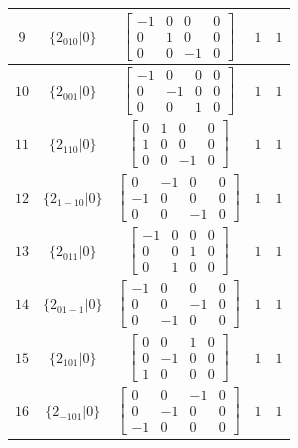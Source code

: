 \documentclass[fleqn,8pt]{jsarticle}
\begin{document}
\begin{longtable}{ccccc}
$ 9 $ & $ \{2{}_{010}|0\} $ & $ \begin{bmatrix} -1 & 0 & 0 & 0 \\ 0 & 1 & 0 & 0 \\ 0 & 0 & -1 & 0 \end{bmatrix} $ & $ 1 $ & $ 1 $ \\ \hline
$ 10 $ & $ \{2{}_{001}|0\} $ & $ \begin{bmatrix} -1 & 0 & 0 & 0 \\ 0 & -1 & 0 & 0 \\ 0 & 0 & 1 & 0 \end{bmatrix} $ & $ 1 $ & $ 1 $ \\ \hline
$ 11 $ & $ \{2{}_{110}|0\} $ & $ \begin{bmatrix} 0 & 1 & 0 & 0 \\ 1 & 0 & 0 & 0 \\ 0 & 0 & -1 & 0 \end{bmatrix} $ & $ 1 $ & $ 1 $ \\ \hline
$ 12 $ & $ \{2{}_{1-10}|0\} $ & $ \begin{bmatrix} 0 & -1 & 0 & 0 \\ -1 & 0 & 0 & 0 \\ 0 & 0 & -1 & 0 \end{bmatrix} $ & $ 1 $ & $ 1 $ \\ \hline
$ 13 $ & $ \{2{}_{011}|0\} $ & $ \begin{bmatrix} -1 & 0 & 0 & 0 \\ 0 & 0 & 1 & 0 \\ 0 & 1 & 0 & 0 \end{bmatrix} $ & $ 1 $ & $ 1 $ \\ \hline
$ 14 $ & $ \{2{}_{01-1}|0\} $ & $ \begin{bmatrix} -1 & 0 & 0 & 0 \\ 0 & 0 & -1 & 0 \\ 0 & -1 & 0 & 0 \end{bmatrix} $ & $ 1 $ & $ 1 $ \\ \hline
$ 15 $ & $ \{2{}_{101}|0\} $ & $ \begin{bmatrix} 0 & 0 & 1 & 0 \\ 0 & -1 & 0 & 0 \\ 1 & 0 & 0 & 0 \end{bmatrix} $ & $ 1 $ & $ 1 $ \\ \hline
$ 16 $ & $ \{2{}_{-101}|0\} $ & $ \begin{bmatrix} 0 & 0 & -1 & 0 \\ 0 & -1 & 0 & 0 \\ -1 & 0 & 0 & 0 \end{bmatrix} $ & $ 1 $ & $ 1 $ \\ \hline

\end{longtable}
\end{document}
